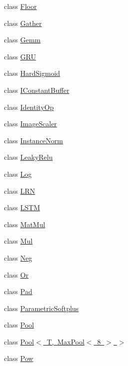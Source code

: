\begin{DoxyCompactItemize}
\item 
class \mbox{\hyperlink{classonnxruntime_1_1cuda_1_1Floor}{Floor}}
\item 
class \mbox{\hyperlink{classonnxruntime_1_1cuda_1_1Gather}{Gather}}
\item 
class \mbox{\hyperlink{classonnxruntime_1_1cuda_1_1Gemm}{Gemm}}
\item 
class \mbox{\hyperlink{classonnxruntime_1_1cuda_1_1GRU}{G\+RU}}
\item 
class \mbox{\hyperlink{classonnxruntime_1_1cuda_1_1HardSigmoid}{Hard\+Sigmoid}}
\item 
class \mbox{\hyperlink{classonnxruntime_1_1cuda_1_1IConstantBuffer}{I\+Constant\+Buffer}}
\item 
class \mbox{\hyperlink{classonnxruntime_1_1cuda_1_1IdentityOp}{Identity\+Op}}
\item 
class \mbox{\hyperlink{classonnxruntime_1_1cuda_1_1ImageScaler}{Image\+Scaler}}
\item 
class \mbox{\hyperlink{classonnxruntime_1_1cuda_1_1InstanceNorm}{Instance\+Norm}}
\item 
class \mbox{\hyperlink{classonnxruntime_1_1cuda_1_1LeakyRelu}{Leaky\+Relu}}
\item 
class \mbox{\hyperlink{classonnxruntime_1_1cuda_1_1Log}{Log}}
\item 
class \mbox{\hyperlink{classonnxruntime_1_1cuda_1_1LRN}{L\+RN}}
\item 
class \mbox{\hyperlink{classonnxruntime_1_1cuda_1_1LSTM}{L\+S\+TM}}
\item 
class \mbox{\hyperlink{classonnxruntime_1_1cuda_1_1MatMul}{Mat\+Mul}}
\item 
class \mbox{\hyperlink{classonnxruntime_1_1cuda_1_1Mul}{Mul}}
\item 
class \mbox{\hyperlink{classonnxruntime_1_1cuda_1_1Neg}{Neg}}
\item 
class \mbox{\hyperlink{classonnxruntime_1_1cuda_1_1Or}{Or}}
\item 
class \mbox{\hyperlink{classonnxruntime_1_1cuda_1_1Pad}{Pad}}
\item 
class \mbox{\hyperlink{classonnxruntime_1_1cuda_1_1ParametricSoftplus}{Parametric\+Softplus}}
\item 
class \mbox{\hyperlink{classonnxruntime_1_1cuda_1_1Pool}{Pool}}
\item 
class \mbox{\hyperlink{classonnxruntime_1_1cuda_1_1Pool_3_01T_00_01MaxPool_3_018_01_4_01_4}{Pool$<$ T, Max\+Pool$<$ 8 $>$ $>$}}
\item 
class \mbox{\hyperlink{classonnxruntime_1_1cuda_1_1Pow}{Pow}}

\end{DoxyCompactItemize}
